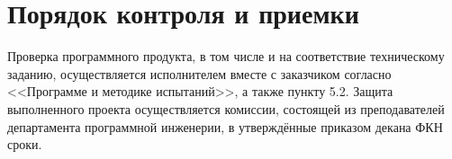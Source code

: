 \documentclass[a4paper,12pt,reqno]{article}
\begin{document}


  \section{Порядок контроля и приемки}
  Проверка программного продукта, в том числе и на соответствие техническому заданию,
  осуществляется исполнителем вместе с заказчиком согласно <<Программе и методике испытаний>>, а также пункту 5.2.
  Защита выполненного проекта осуществляется комиссии, состоящей из преподавателей департамента программной инженерии,
  в утверждённые приказом декана ФКН сроки.

  \begin{CRTbibliography}
  \end{CRTbibliography}

  \CRTlistRegistration
\end{document}
